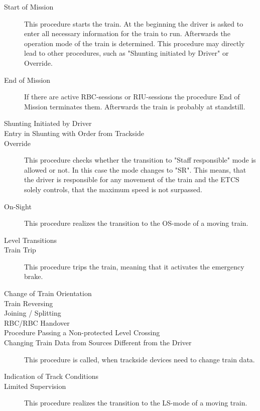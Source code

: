 \documentclass{template/openetcs_article}
\begin{document}
\begin{description}
	\item[Start of Mission] 
	This procedure starts the train. At the beginning the driver is asked to enter all necessary information for the train to run. Afterwards the operation mode of the train is determined. This procedure may directly lead to other procedures, such as "Shunting initiated by Driver" or Override.
	
%
	\item[End of Mission]
	
	If there are active RBC-sessions or RIU-sessions the procedure End of Mission terminates them. Afterwards the train is probably at standstill.
	
	
%
	\item[Shunting Initiated by Driver]
%
	\item[Entry in Shunting with Order from Trackside]
%
	\item[Override]
	
	This procedure checks whether the transition to "Staff responsible" mode is allowed or not. In this case the mode changes to "SR". This means, that the driver is responsible for any movement of the train and the ETCS solely controls, that the maximum speed is not surpassed.
%
	\item[On-Sight]
	
	This procedure realizes the transition to the OS-mode of a moving train.
%
	\item[Level Transitions]
%
	\item[Train Trip]
	
	This procedure trips the train, meaning that it activates the emergency brake. 
%
	\item[Change of Train Orientation]
%
	\item[Train Reversing]
%
	\item[Joining / Splitting]
%
	\item[RBC/RBC Handover]
%
	\item[Procedure Passing a Non-protected Level Crossing]
%
	\item[Changing Train Data from Sources Different from the Driver]
	This procedure is called, when trackside devices need to change train data.
%
	\item[Indication of Track Conditions]
%
	\item[Limited Supervision]
	
	This procedure realizes the transition to the LS-mode of a moving train.
\end{description}
\end{document}
